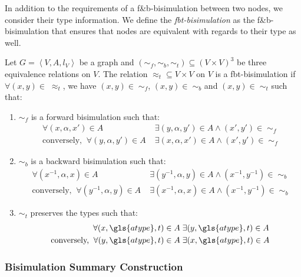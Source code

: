 In addition to the requirements of a f\&b-bisimulation between two nodes, we consider their type information. We define the \emph{fbt-bisimulation} as the f\&b-bisimulation that ensures that nodes are equivalent with regards to their type as well.

\begin{definition}
Let $G=\left\langle V, A, l_V \right\rangle$ be a graph and $(\sim_f, \sim_b, \sim_t) \subseteq (V \times V)^3$ be three equivalence relations on $V$.
The relation $\approx_t \subseteq V \times V$ on $V$ is a fbt-bisimulation if $\forall (x,y) \in\; \approx_t$, we have $(x,y) \in\; \sim_f$, $(x,y) \in\; \sim_b$ and $(x,y) \in\; \sim_t$ such that:
\begin{enumerate}
\item $\sim_f$ is a forward bisimulation such that:
$$
\begin{aligned}
\forall (x, \alpha, x') \in A&\; \exists (y, \alpha, y') \in A \wedge (x',y') \in\; \sim_f \\
\text{conversely,}\;\; \forall (y, \alpha, y') \in A&\; \exists (x, \alpha, x') \in A \wedge (x',y') \in\; \sim_f
\end{aligned}
$$

\item $\sim_b$ is a backward bisimulation such that:
$$
\begin{aligned}
\forall (x^{-1}, \alpha, x) \in A&\; \exists (y^{-1}, \alpha, y) \in A \wedge (x^{-1}, y^{-1}) \in\; \sim_b \\
\text{conversely,}\;\; \forall (y^{-1}, \alpha, y) \in A&\; \exists (x^{-1}, \alpha, x) \in A \wedge (x^{-1}, y^{-1}) \in\; \sim_b
\end{aligned}
$$

\item $\sim_t$ preserves the types such that:
$$
\begin{aligned}
\forall (x, \gls{atype}, t) \in A&\; \exists (y, \gls{atype}, t) \in A \\
\text{conversely,}\;\; \forall (y, \gls{atype}, t) \in A&\; \exists (x, \gls{atype}, t) \in A
\end{aligned}
$$

\end{enumerate}
\end{definition}

\subsubsection{Bisimulation Summary Construction}

